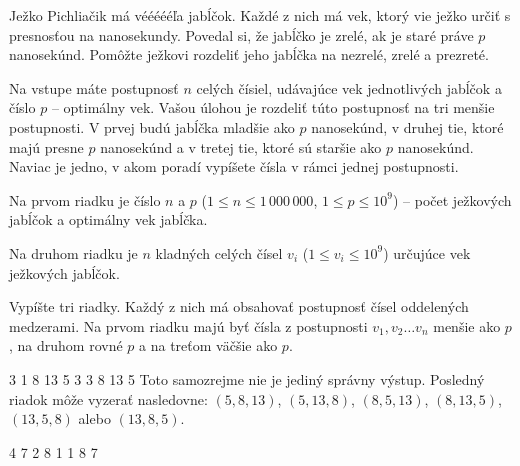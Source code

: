 




Ježko Pichliačik má véééééľa jabĺčok. Každé z nich má vek, ktorý vie ježko
určiť s presnosťou na nanosekundy. Povedal si, že jabĺčko je zrelé, ak je staré
práve $p$ nanosekúnd. Pomôžte ježkovi rozdeliť jeho jabĺčka na nezrelé, zrelé a
prezreté.


Na vstupe máte postupnosť $n$ celých čísiel, udávajúce vek jednotlivých jabĺčok
a číslo $p$ -- optimálny vek. Vašou úlohou je rozdeliť túto postupnosť na tri
menšie postupnosti. V prvej budú jabĺčka mladšie ako $p$ nanosekúnd, v druhej
tie, ktoré majú presne $p$ nanosekúnd a v tretej tie, ktoré sú staršie ako $p$
nanosekúnd. Naviac je jedno, v akom poradí vypíšete čísla v rámci jednej
postupnosti.


Na prvom riadku je číslo $n$ a $p$ ($1 \leq n \leq 1\,000\,000$, $1\leq p\leq
10^9$) -- počet ježkových jabĺčok a optimálny vek jabĺčka.

Na druhom riadku je $n$ kladných celých čísel $v_i$ ($1 \leq v_i \leq 10^9$)
určujúce vek ježkových jabĺčok.


Vypíšte tri riadky. Každý z nich má obsahovať postupnosť čísel oddelených
medzerami. Na prvom riadku majú byť čísla z postupnosti $v_1, v_2 \dots v_n$
menšie ako $p$, na druhom rovné $p$ a na treťom väčšie ako $p$.


 3
1 8 13 5 3
3
8 13 5
\komentar
Toto samozrejme nie je jediný správny výstup. Posledný riadok môže vyzerať
nasledovne: $(5, 8, 13)$, $(5, 13, 8)$, $(8, 5, 13)$, $(8, 13, 5)$, $(13, 5,
8)$ alebo $(13, 8, 5)$. 
\koniec

 4
7 2 8 1
 1
8 7
\koniec


